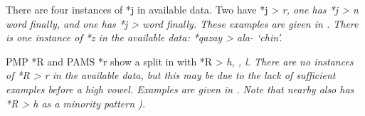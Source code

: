 \newpage
There are four instances of *j in available data.
Two have *j > \it{r},
one has *j > \it{n} word finally,
and one has *j > {\0} word finally.
These examples are given in .
There is one instance of *z in the available data: *qazay > \it{ala-} ‘chin’.


PMP *R
and PAMS *r show a split in  with *R > \it{h,} {\0}\it{, l}.
There are no instances of *R > \it{r} in the available data,
but this may be due to the lack of sufficient examples before a high vowel.
Examples are given in .
Note that nearby  also has *R > \it{h} as a minority
pattern ).

